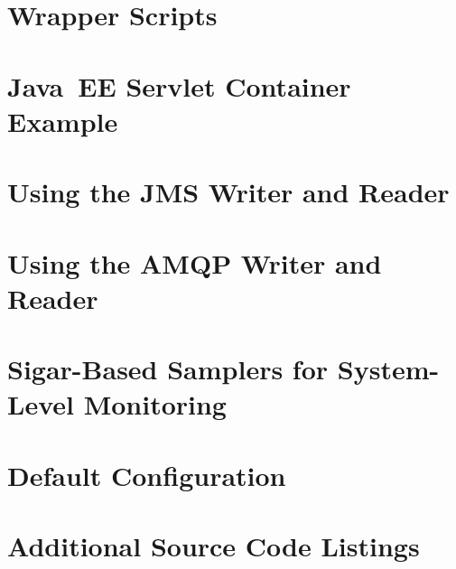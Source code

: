 % 

\newpage
\appendix

{}
\hypertarget{hypertarget:appendix}{}

\chapter{Wrapper Scripts}\label{appendix:wrapperScripts}


\chapter{Java~EE Servlet Container Example}\label{appendix:JavaEEServletExample}


\chapter{Using the JMS Writer and Reader}\label{appendix:usingJMS}


\chapter{Using the AMQP Writer and Reader}\label{appendix:usingAMQP}


\chapter{Sigar-Based Samplers for System-Level Monitoring}\label{appendix:SigarBasedSamplers}


\chapter{\KiekerMonitoringPart{} Default Configuration}\label{sec:appdx:monitoringproperties}


\chapter{Additional Source Code Listings}\label{appendix:additionalSourceCode}


